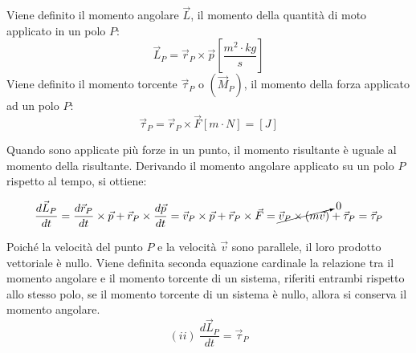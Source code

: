 \documentclass{article}
\numberwithin{equation}{subsection}
\begin{document}
\begin{center}\end{center}

Viene definito il momento angolare $\vec{L}$, il momento della 
quantità di moto applicato in un polo $P$:
\begin{equation} 
    \vec{L}_P=\vec{r}_P\times\vec{p}\left[\displaystyle\frac{m^2\cdot kg}{s}\right]
\end{equation}
Viene definito il momento torcente $\vec{\tau}_P$ o $(\vec{M}_P)$, il momento della forza applicato 
ad un polo $P$:
\begin{equation}
    \vec{\tau}_P=\vec{r}_P\times\vec{F}\left[m\cdot N\right]=[J]
\end{equation}

Quando sono applicate più forze in un punto, il momento risultante è uguale al momento della risultante. 
Derivando il momento angolare applicato su un polo $P$ rispetto al tempo, si ottiene: 

\begin{equation}
    \displaystyle\frac{d\vec{L}_P}{dt}=\frac{d\vec{r}_P}{dt}\times\vec{p}+\vec{r}_P\times\frac{d\vec{p}}{dt}=\vec{v}_P\times\vec{p}+\vec{r}_P\times\vec{F}=\cancelto{0}{\vec{v}_P\times(m\vec{v})}+\vec{\tau}_P=\vec{\tau}_P
\end{equation}


Poiché la velocità del punto $P$ e la velocità 
$\vec{v}$ sono parallele, il loro prodotto vettoriale è nullo.
Viene 
definita seconda equazione cardinale la relazione tra il momento angolare e il momento torcente di un sistema, riferiti entrambi rispetto allo stesso polo, se il momento torcente di un sistema è nullo, allora si conserva 
il momento angolare.
\begin{equation*}
    (ii)\:\displaystyle\frac{d\vec{L}_P}{dt}=\vec{\tau}_P
\end{equation*}
\end{document}
